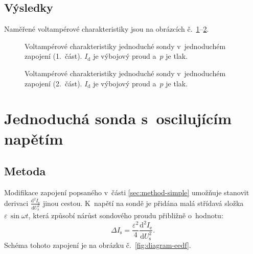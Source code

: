 \documentclass{protokol}
\newcommand\pres{p}
\newcommand\idisch{I_\mathrm{d}}
\newcommand\iprobe{I_\mathrm{s}}
\newcommand\ielec{I_\mathrm{e}}
\newcommand\uprobe{U_\mathrm{s}}
\newcommand\didu{\frac{\mathrm d^2 \ielec}{\mathrm d \uprobe^2}}
\newcommand\ueedf{\varepsilon}
\begin{document}
\subsection{Výsledky}
\label{results-simple}
Naměřené voltampérové charakteristiky jsou na obrázcích
č.~\ref{fig:simple1-vac-1}--\ref{fig:simple1-vac-2}.

\begin{figure}[p]
	\centering
	
	
	\par\smallskip
	
	
	\par\smallskip
	
	
	\par\smallskip
	
	
	\caption{Voltampérové charakteristiky jednoduché sondy
		v~jednoduchém zapojení (1.~část).
		$\idisch$ je výbojový proud a~$\pres$ je tlak.}
	\label{fig:simple1-vac-1}
\end{figure}
\begin{figure}[p]
	\centering
	
	
	\par\smallskip
	
	
	\par\smallskip
	
	
	\caption{Voltampérové charakteristiky jednoduché sondy
		v~jednoduchém zapojení (2.~část).
		$\idisch$ je výbojový proud a~$\pres$ je tlak.}
	\label{fig:simple1-vac-2}
\end{figure}

\clearpage
\section{Jednoduchá sonda s~oscilujícím napětím}
\label{sec:eedf}

\subsection{Metoda}
\label{sec:method-eedf}
Modifikace zapojení popsaného v~části \ref{sec:method-simple}
umožňuje stanovit derivaci $\didu$ jinou cestou.
K~napětí na sondě je přidána malá střídavá složka $\ueedf\,\sin{\omega t}$,
která způsobí nárůst sondového proudu přibližně o~hodnotu:
\begin{equation}
	\label{eq:eedf-idiff}
	\Delta\iprobe = \frac{\ueedf^2}{4}\didu.
\end{equation}
Schéma tohoto zapojení je na obrázku č.~\ref{fig:diagram-eedf}.
\end{document}
